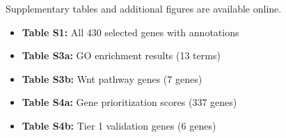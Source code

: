 \documentclass[11pt,letterpaper]{article}
\begin{document}
Supplementary tables and additional figures are available online.

\begin{itemize}
    \item \textbf{Table S1:} All 430 selected genes with annotations
    \item \textbf{Table S3a:} GO enrichment results (13 terms)
    \item \textbf{Table S3b:} Wnt pathway genes (7 genes)
    \item \textbf{Table S4a:} Gene prioritization scores (337 genes)
    \item \textbf{Table S4b:} Tier 1 validation genes (6 genes)
\end{itemize}
\end{document}
